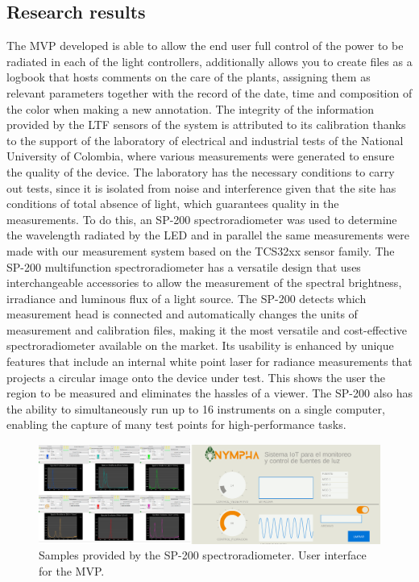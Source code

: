 \documentclass[letterpaper,12pt,twoside]{articleingud}
\begin{document}
\subsection{Research results}
The MVP developed is able to allow the end user full control of the power to be radiated in each of the light controllers, additionally allows you to create files as a logbook that hosts comments on the care of the plants, assigning them as relevant parameters together with the record of the date, time and composition of the color when making a new annotation. The integrity of the information provided by the LTF sensors of the system is attributed to its calibration thanks to the support of the laboratory of electrical and industrial tests of the National University of Colombia, where various measurements were generated to ensure the quality of the device. The laboratory has the necessary conditions to carry out tests, since it is isolated from noise and interference given that the site has conditions of total absence of light, which guarantees quality in the measurements. To do this, an SP-200 spectroradiometer was used to determine the wavelength radiated by the LED and in parallel the same measurements were made with our measurement system based on the TCS32xx sensor family. The SP-200 multifunction spectroradiometer has a versatile design that uses interchangeable accessories to allow the measurement of the spectral brightness, irradiance and luminous flux of a light source. The SP-200 detects which measurement head is connected and automatically changes the units of measurement and calibration files, making it the most versatile and cost-effective spectroradiometer available on the market. Its usability is enhanced by unique features that include an internal white point laser for radiance measurements that projects a circular image onto the device under test. This shows the user the region to be measured and eliminates the hassles of a viewer. The SP-200 also has the ability to simultaneously run up to 16 instruments on a single computer, enabling the capture of many test points for high-performance tasks.\cite{LABE}
\begin{figure}
 \begin{center}
  \includegraphics[width=16cm]{images/interface_data.png}
   \caption{Samples provided by the SP-200 spectroradiometer. User interface for the MVP. \cite{wiki}} \end{center}
\end{figure}
\end{document}
